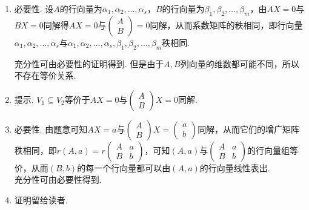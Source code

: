 \documentclass[12pt,fontset=fandol]{ctexart}
\begin{document}
\begin{solve}
\begin{enumerate}
                \item 必要性. 设$A$的行向量为$\alpha_1,\alpha_2,\ldots,\alpha_s$，$B$的行向量为$\beta_1,\beta_2,\ldots,\beta_m$，由$AX=0$与$BX=0$同解得$AX=0$与$\begin{pmatrix}A \\ B\end{pmatrix}=0$同解，从而系数矩阵的秩相同，即行向量$\alpha_1,\alpha_2,\ldots,\alpha_s$与$\alpha_1,\alpha_2,\ldots,\alpha_s,\beta_1,\beta_2,\ldots,\beta_m$秩相同. 

                      充分性可由必要性的证明得到. 但是由于$A,B$列向量的维数都可能不同，所以不存在等价关系.

                \item 提示. $V_1\subseteq V_2$等价于$AX=0$与$\begin{pmatrix}
                              A \\
                              B
                          \end{pmatrix}X=0$同解.

                \item 必要性. 由题意可知$AX=a$与$\begin{pmatrix} A \\ B \end{pmatrix}X=\begin{pmatrix} a \\ b \end{pmatrix}$同解，从而它们的增广矩阵秩相同，即$r(A,a)=r\begin{pmatrix}
                              A & a \\
                              B & b
                          \end{pmatrix}$，可知$(A,a)$与$\begin{pmatrix}
                              A & a \\
                              B & b
                          \end{pmatrix}$的行向量组等价，从而$(B,b)$的每一个行向量都可以由$(A,a)$的行向量线性表出.\\
                      充分性可由必要性得到.

                \item 证明留给读者.
            \end{enumerate}
\end{solve}
\end{document}
